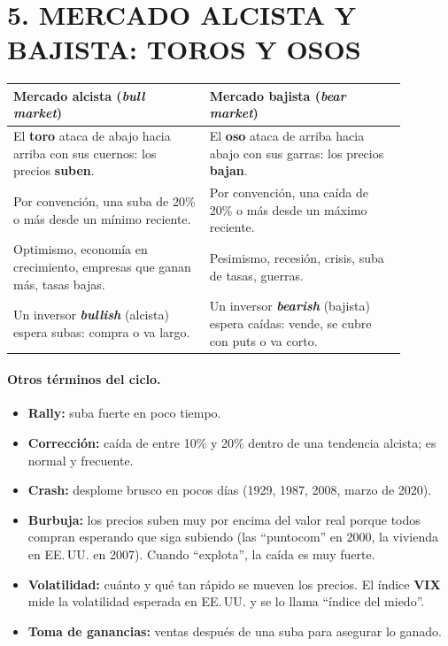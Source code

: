 \section*{5. MERCADO ALCISTA Y BAJISTA: TOROS Y OSOS}

\begin{center}
\small
\begin{tabular}{|p{0.44\linewidth}|p{0.44\linewidth}|}
\hline
\textbf{Mercado alcista (\textit{bull market})} & \textbf{Mercado bajista (\textit{bear market})}
\\ \hline
El \textbf{toro} ataca de abajo hacia arriba con sus cuernos: los precios \textbf{suben}. &
El \textbf{oso} ataca de arriba hacia abajo con sus garras: los precios \textbf{bajan}. \\
\hline
Por convención, una suba de 20\% o más desde un mínimo reciente. & Por convención, una caída de
20\% o más desde un máximo reciente. \\ \hline
Optimismo, economía en crecimiento, empresas que ganan más, tasas bajas. & Pesimismo, recesión,
crisis, suba de tasas, guerras. \\ \hline
Un inversor \textbf{\textit{bullish}} (alcista) espera subas: compra o va largo. & Un inversor
\textbf{\textit{bearish}} (bajista) espera caídas: vende, se cubre con puts o va corto. \\
\hline
\end{tabular}
\end{center}

\paragraph*{Otros términos del ciclo.}
\begin{itemize}
  \item \textbf{Rally:} suba fuerte en poco tiempo.
  \item \textbf{Corrección:} caída de entre 10\% y 20\% dentro de una tendencia alcista; es
        normal y frecuente.
  \item \textbf{Crash:} desplome brusco en pocos días (1929, 1987, 2008, marzo de 2020).
  \item \textbf{Burbuja:} los precios suben muy por encima del valor real porque todos compran
        esperando que siga subiendo (las ``puntocom'' en 2000, la vivienda en EE.\,UU. en 2007).
        Cuando ``explota'', la caída es muy fuerte.
  \item \textbf{Volatilidad:} cuánto y qué tan rápido se mueven los precios. El índice
        \textbf{VIX} mide la volatilidad esperada en EE.\,UU. y se lo llama ``índice del miedo''.
  \item \textbf{Toma de ganancias:} ventas después de una suba para asegurar lo ganado.
\end{itemize}

